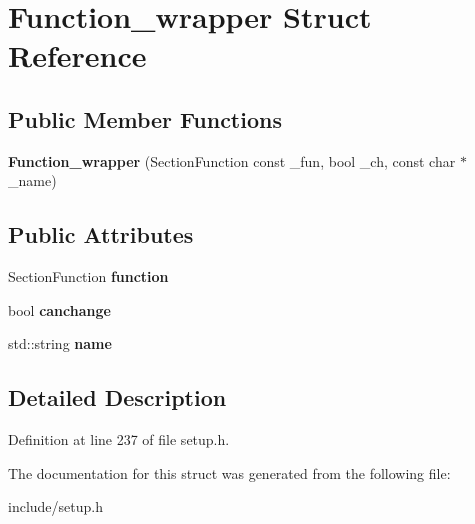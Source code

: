 \hypertarget{structFunction__wrapper}{\section{Function\-\_\-wrapper Struct Reference}
\label{structFunction__wrapper}
}
\subsection*{Public Member Functions}
\begin{DoxyCompactItemize}
\item 
\hypertarget{structFunction__wrapper_a42e855bf8f4ff2cdb3b3fc61982a0e2a}{{\bfseries Function\-\_\-wrapper} (Section\-Function const \-\_\-fun, bool \-\_\-ch, const char $\ast$\-\_\-name)}\label{structFunction__wrapper_a42e855bf8f4ff2cdb3b3fc61982a0e2a}

\end{DoxyCompactItemize}
\subsection*{Public Attributes}
\begin{DoxyCompactItemize}
\item 
\hypertarget{structFunction__wrapper_a37c15a5a48deb464bfbcf0ac2aeed1f4}{Section\-Function {\bfseries function}}\label{structFunction__wrapper_a37c15a5a48deb464bfbcf0ac2aeed1f4}

\item 
\hypertarget{structFunction__wrapper_a07ef638dcc9ab91a2649aeebf09685a6}{bool {\bfseries canchange}}\label{structFunction__wrapper_a07ef638dcc9ab91a2649aeebf09685a6}

\item 
\hypertarget{structFunction__wrapper_a5272f1f398f64bf611d1b6d3fd8848cb}{std\-::string {\bfseries name}}\label{structFunction__wrapper_a5272f1f398f64bf611d1b6d3fd8848cb}

\end{DoxyCompactItemize}


\subsection{Detailed Description}


Definition at line 237 of file setup.\-h.



The documentation for this struct was generated from the following file\-:\begin{DoxyCompactItemize}
\item 
include/setup.\-h\end{DoxyCompactItemize}
